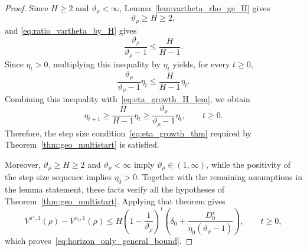 \documentclass[11pt]{article}
\begin{document}
\begin{proof}
Since $H\ge2$ and $\vartheta_\rho<\infty$,
Lemma~\ref{lem:vartheta_rho_ge_H} gives
\[
\vartheta_\rho\ge H\ge2,
\]
and \eqref{eq:ratio_vartheta_by_H} gives
\[
\frac{\vartheta_\rho}{\vartheta_\rho-1}
\le
\frac{H}{H-1}.
\]
Since $\eta_t>0$, multiplying this inequality by $\eta_t$ yields, for
every $t\ge0$,
\[
\frac{\vartheta_\rho}{\vartheta_\rho-1}\eta_t
\le
\frac{H}{H-1}\eta_t.
\]
Combining this inequality with~\eqref{eq:eta_growth_H_lem}, we obtain
\[
\eta_{t+1}
\ge
\frac{H}{H-1}\eta_t
\ge
\frac{\vartheta_\rho}{\vartheta_\rho-1}\eta_t,
\qquad t\ge0.
\]
Therefore, the step size condition~\eqref{eq:eta_growth_thm} required
by Theorem~\ref{thm:geo_multistart} is satisfied.

Moreover, $\vartheta_\rho\ge H\ge2$ and
$\vartheta_\rho<\infty$ imply $\vartheta_\rho\in(1,\infty)$, while
the positivity of the step size sequence implies $\eta_0>0$.
Together with the remaining assumptions in the lemma statement, these
facts verify all the hypotheses of
Theorem~\ref{thm:geo_multistart}. Applying that theorem gives
\[
V^{\pi^\star,1}(\rho)-V^{\pi_t,1}(\rho)
\le
H\left(1-\frac{1}{\vartheta_\rho}\right)^t
\left(
\delta_0+
\frac{D_0^\star}{\eta_0(\vartheta_\rho-1)}
\right),
\qquad t\ge0,
\]
which proves~\eqref{eq:horizon_only_general_bound}.
\end{proof}
\end{document}
